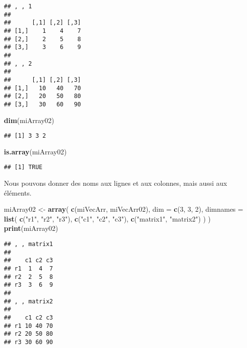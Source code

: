 \documentclass[]{book}
\newenvironment{Shaded}{\begin{snugshade}}{\end{snugshade}}
\newcommand{\KeywordTok}[1]{\textcolor[rgb]{0.13,0.29,0.53}{\textbf{#1}}}
\newcommand{\DataTypeTok}[1]{\textcolor[rgb]{0.13,0.29,0.53}{#1}}
\newcommand{\DecValTok}[1]{\textcolor[rgb]{0.00,0.00,0.81}{#1}}
\newcommand{\StringTok}[1]{\textcolor[rgb]{0.31,0.60,0.02}{#1}}
\newcommand{\NormalTok}[1]{#1}
\theoremstyle{definition}
\theoremstyle{definition}
\theoremstyle{definition}
\theoremstyle{remark}
\begin{document}
\begin{verbatim}
## , , 1
## 
##      [,1] [,2] [,3]
## [1,]    1    4    7
## [2,]    2    5    8
## [3,]    3    6    9
## 
## , , 2
## 
##      [,1] [,2] [,3]
## [1,]   10   40   70
## [2,]   20   50   80
## [3,]   30   60   90
\end{verbatim}

\begin{Shaded}
\begin{Highlighting}[]
\KeywordTok{dim}\NormalTok{(miArray02)}
\end{Highlighting}
\end{Shaded}

\begin{verbatim}
## [1] 3 3 2
\end{verbatim}

\begin{Shaded}
\begin{Highlighting}[]
\KeywordTok{is.array}\NormalTok{(miArray02)}
\end{Highlighting}
\end{Shaded}

\begin{verbatim}
## [1] TRUE
\end{verbatim}

Nous pouvons donner des noms aux lignes et aux colonnes, mais aussi aux
éléments.

\begin{Shaded}
\begin{Highlighting}[]
\NormalTok{miArray02 <-}\StringTok{ }\KeywordTok{array}\NormalTok{(}
  \KeywordTok{c}\NormalTok{(miVecArr, miVecArr02), }
  \DataTypeTok{dim =} \KeywordTok{c}\NormalTok{(}\DecValTok{3}\NormalTok{, }\DecValTok{3}\NormalTok{, }\DecValTok{2}\NormalTok{), }
  \DataTypeTok{dimnames =} \KeywordTok{list}\NormalTok{(}
    \KeywordTok{c}\NormalTok{(}\StringTok{"r1"}\NormalTok{, }\StringTok{"r2"}\NormalTok{, }\StringTok{"r3"}\NormalTok{), }
    \KeywordTok{c}\NormalTok{(}\StringTok{"c1"}\NormalTok{, }\StringTok{"c2"}\NormalTok{, }\StringTok{"c3"}\NormalTok{), }
    \KeywordTok{c}\NormalTok{(}\StringTok{"matrix1"}\NormalTok{, }\StringTok{"matrix2"}\NormalTok{)}
\NormalTok{  )}
\NormalTok{)}
\KeywordTok{print}\NormalTok{(miArray02)}
\end{Highlighting}
\end{Shaded}

\begin{verbatim}
## , , matrix1
## 
##    c1 c2 c3
## r1  1  4  7
## r2  2  5  8
## r3  3  6  9
## 
## , , matrix2
## 
##    c1 c2 c3
## r1 10 40 70
## r2 20 50 80
## r3 30 60 90
\end{verbatim}
\end{document}
